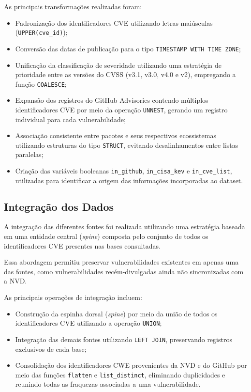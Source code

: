 As principais transformações realizadas foram:

\begin{itemize}
\item Padronização dos identificadores CVE utilizando letras maiúsculas (\verb|UPPER(cve_id)|);
\item Conversão das datas de publicação para o tipo \verb|TIMESTAMP WITH TIME ZONE|;
\item Unificação da classificação de severidade utilizando uma estratégia de prioridade entre as versões do CVSS (v3.1, v3.0, v4.0 e v2), empregando a função \verb|COALESCE|;
\item Expansão dos registros do GitHub Advisories contendo múltiplos identificadores CVE por meio da operação \verb|UNNEST|, gerando um registro individual para cada vulnerabilidade;
\item Associação consistente entre pacotes e seus respectivos ecossistemas utilizando estruturas do tipo \verb|STRUCT|, evitando desalinhamentos entre listas paralelas;
\item Criação das variáveis booleanas \verb|in_github|, \verb|in_cisa_kev| e \verb|in_cve_list|, utilizadas para identificar a origem das informações incorporadas ao dataset.
\end{itemize}

\subsection{Integração dos Dados}

A integração das diferentes fontes foi realizada utilizando uma estratégia baseada em uma entidade central (\textit{spine}) composta pelo conjunto de todos os identificadores CVE presentes nas bases consultadas.

Essa abordagem permitiu preservar vulnerabilidades existentes em apenas uma das fontes, como vulnerabilidades recém-divulgadas ainda não sincronizadas com a NVD.

As principais operações de integração incluem:

\begin{itemize}
\item Construção da espinha dorsal (\textit{spine}) por meio da união de todos os identificadores CVE utilizando a operação \verb|UNION|;
\item Integração das demais fontes utilizando \verb|LEFT JOIN|, preservando registros exclusivos de cada base;
\item Consolidação dos identificadores CWE provenientes da NVD e do GitHub por meio das funções \verb|flatten| e \verb|list_distinct|, eliminando duplicidades e reunindo todas as fraquezas associadas a uma vulnerabilidade.
\end{itemize}